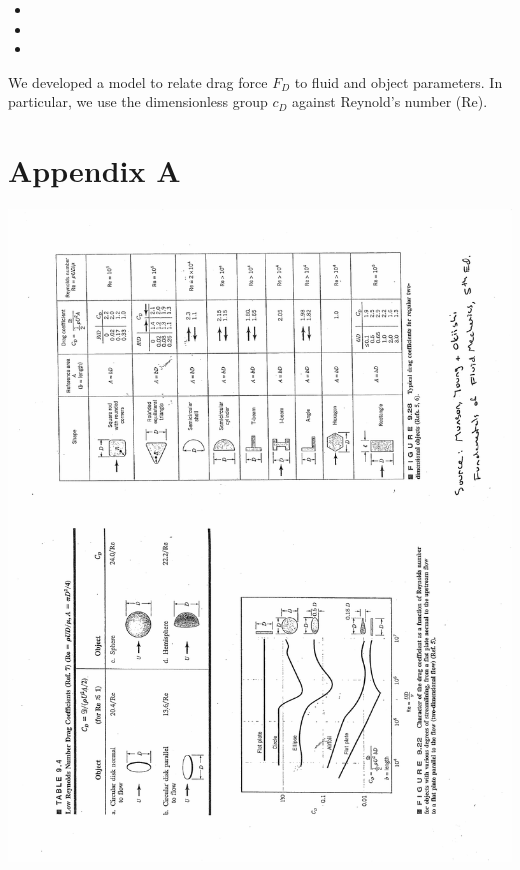 \documentclass[paper=a4, fontsize=12pt]{scrartcl} %
\numberwithin{equation}{section} %
\numberwithin{figure}{section} %
\numberwithin{table}{section} %
\begin{document}
\begin{itemize}
  \item 
  \item 
  \item
\end{itemize}

We developed a model to relate drag force $F_D$ to fluid and object parameters. In particular, we use the dimensionless group $c_D$ against Reynold's number (Re).

\newpage

 \section*{Appendix A}

 \includegraphics[scale=0.90]{Munsonfigure94.pdf}
 
 \newpage
 
\end{document}
